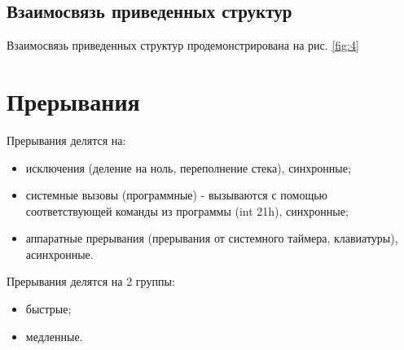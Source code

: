 \subsection{Взаимосвязь приведенных структур}

Взаимосвязь приведенных структур продемонстрирована на рис. \ref{fig:4}

\begin{figure}[ht!]
\end{figure}

\newpage

\section{Прерывания}

Прерывания делятся на:

\begin{itemize}
	\item исключения (деление на ноль, переполнение стека), синхронные;
	\item системные вызовы (программные) - вызываются с помощью соответствующей команды из программы (int 21h), синхронные;
	\item аппаратные прерывания (прерывания от системного таймера, клавиатуры), асинхронные. 
\end{itemize}

Прерывания делятся на 2 группы:

\begin{itemize}
	\item быстрые;
	\item медленные. 
\end{itemize}


